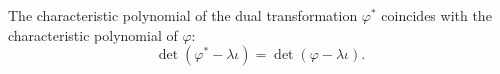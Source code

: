 The characteristic polynomial of the dual transformation $\varphi^*$ coincides with the characteristic polynomial of $\varphi$:
$$\det(\varphi^* - \lambda \iota) = \det(\varphi - \lambda \iota).$$
